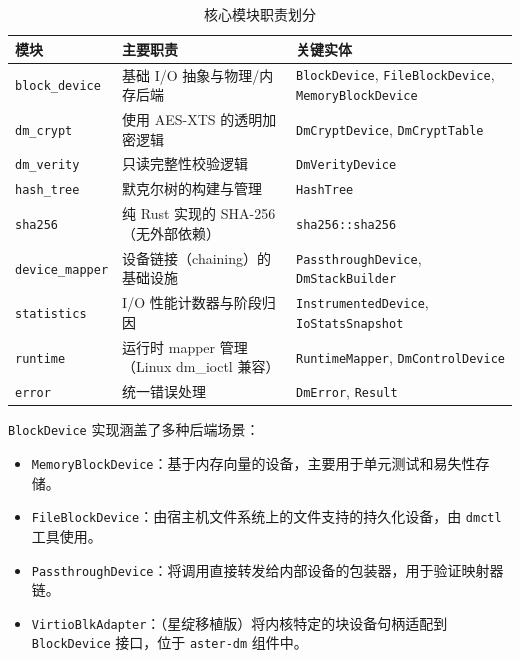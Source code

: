\begin{table}[H]
    \centering
    \caption{核心模块职责划分}
    \label{tab:modules}
    \begin{tabular}{p{}p{}p{}}
        \toprule
        \textbf{模块} & \textbf{主要职责} & \textbf{关键实体} \\
        \midrule
        \texttt{block\_\allowbreak device} & 基础 I/O 抽象与物理/内存后端 & \texttt{BlockDevice}, \texttt{File\allowbreak Block\allowbreak Device}, \texttt{Memory\allowbreak Block\allowbreak Device} \\
        \texttt{dm\_\allowbreak crypt} & 使用 AES-XTS 的透明加密逻辑 & \texttt{DmCrypt\allowbreak Device}, \texttt{DmCrypt\allowbreak Table} \\
        \texttt{dm\_\allowbreak verity} & 只读完整性校验逻辑 & \texttt{DmVerity\allowbreak Device} \\
        \texttt{hash\_\allowbreak tree} & 默克尔树的构建与管理 & \texttt{HashTree} \\
        \texttt{sha256} & 纯 Rust 实现的 SHA-256（无外部依赖） & \texttt{sha256::\allowbreak sha256} \\
        \texttt{device\_\allowbreak mapper} & 设备链接（chaining）的基础设施 & \texttt{Passthrough\allowbreak Device}, \texttt{DmStack\allowbreak Builder} \\
        \texttt{statistics} & I/O 性能计数器与阶段归因 & \texttt{Instrumented\allowbreak Device}, \texttt{IoStats\allowbreak Snapshot} \\
        \texttt{runtime} & 运行时 mapper 管理（Linux dm\_ioctl 兼容） & \texttt{Runtime\allowbreak Mapper}, \texttt{DmControl\allowbreak Device} \\
        \texttt{error} & 统一错误处理 & \texttt{DmError}, \texttt{Result} \\
        \bottomrule
    \end{tabular}
\end{table}

\texttt{BlockDevice} 实现涵盖了多种后端场景：
\begin{itemize}
    \item \texttt{Memory\allowbreak Block\allowbreak Device}：基于内存向量的设备，主要用于单元测试和易失性存储。
    \item \texttt{File\allowbreak Block\allowbreak Device}：由宿主机文件系统上的文件支持的持久化设备，由 \texttt{dmctl} 工具使用。
    \item \texttt{Passthrough\allowbreak Device}：将调用直接转发给内部设备的包装器，用于验证映射器链。
    \item \texttt{Virtio\allowbreak Blk\allowbreak Adapter}：（星绽移植版）将内核特定的块设备句柄适配到 \texttt{BlockDevice} 接口，位于 \texttt{aster-\allowbreak dm} 组件中。
\end{itemize}

